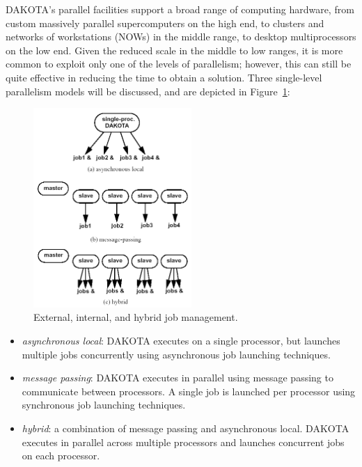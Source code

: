 DAKOTA's parallel facilities support a broad range of computing
hardware, from custom massively parallel supercomputers on the high
end, to clusters and networks of workstations (NOWs) in the middle
range, to desktop multiprocessors on the low end. Given the reduced
scale in the middle to low ranges, it is more common to exploit only
one of the levels of parallelism; however, this can still be quite
effective in reducing the time to obtain a solution.  Three
single-level parallelism models will be discussed, and are depicted
in Figure~\ref{parallel:figure03}:

\begin{figure}[ht]
  \centering
  \includegraphics[width=60mm]{images/ex_in_hy_job_management}
  \caption{External, internal, and hybrid job management.}
  \label{parallel:figure03}
\end{figure}

\begin{itemize}
\item \emph{asynchronous local}: DAKOTA executes on a single processor,
but launches multiple jobs concurrently using asynchronous job launching
techniques.

\item \emph{message passing}: DAKOTA executes in parallel using message
passing to communicate between processors.  A single job is launched
per processor using synchronous job launching techniques.

\item \emph{hybrid}: a combination of message passing and asynchronous
local.  DAKOTA executes in parallel across multiple processors and
launches concurrent jobs on each processor.
\end{itemize}

